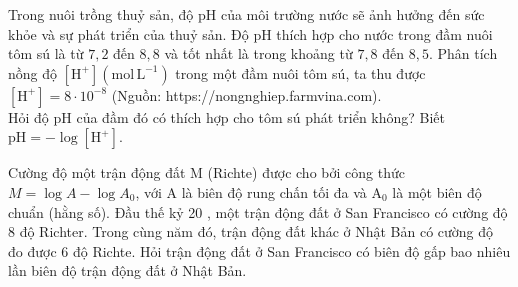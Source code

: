 \begin{bt}%
	Trong nuôi trồng thuỷ sản, độ $\mathrm{pH}$ của môi trường nước sẽ ảnh hưởng đến sức khỏe và sự phát triển của thuỷ sản. Độ $\mathrm{pH}$ thích hợp cho nước trong đầm nuôi tôm sú là từ $7{,}2$ đến $8{,}8$ và tốt nhất là trong khoảng từ $7{,}8$ đến $8{,}5$. Phân tích nồng độ $\left[\mathrm{H}^{+}\right]\left(\mathrm{mol}\, \mathrm{L}^{-1}\right)$ trong một đầm nuôi tôm sú, ta thu được $\left[\mathrm{H}^{+}\right]=8\cdot10^{-8}$ (Nguồn: https://nongnghiep.farmvina.com). \\
	Hỏi độ $\mathrm{pH}$ của đầm đó có thích hợp cho tôm sú phát triển không? Biết $\mathrm{pH}=-\log \left[\mathrm{H}^{+}\right]$.
\end{bt}	

\begin{bt}
	Cường độ một trận động đất $\mathrm{M}$ (Richte) được cho bởi công thức $M=\log A-\log A_0$, với A là biên độ rung chấn tối đa và $\mathrm{A}_0$ là một biên độ chuẩn (hằng số). Đầu thế kỷ 20 , một trận động đất ở San Francisco có cường độ 8 độ Richter. Trong cùng năm đó, trận động đất khác ở Nhật Bản có cường độ đo được 6 độ Richte. Hỏi trận động đất ở San Francisco có biên độ gấp bao nhiêu lần biên độ trận động đất ở Nhật Bản.
\end{bt}